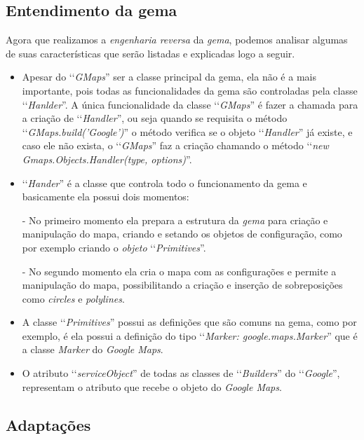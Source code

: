  
\subsection{Entendimento da gema} 
\label{subsection:entendimento_da_gema} 

Agora que realizamos a \emph{engenharia reversa} da \emph{gema}, podemos analisar algumas de suas 
características que serão listadas e explicadas logo a seguir.

\begin{itemize}

 \item Apesar do ‘‘\emph{GMaps}'' ser a classe principal da gema, ela não é a mais
 importante, pois todas as funcionalidades da gema são controladas pela classe
 ‘‘\emph{Hanlder}''. A única funcionalidade da classe ‘‘\emph{GMaps}'' é fazer a chamada
 para a criação de ‘‘\emph{Handler}'', ou seja quando se requisita o método 
 ‘‘\emph{GMaps.build('Google')}'' o método verifica se o objeto ‘‘\emph{Handler}'' já
 existe, e caso ele não exista, o ‘‘\emph{GMaps}'' faz a criação chamando o método 
 ‘‘\emph{new Gmaps.Objects.Handler(type, options)}''.

 \item ‘‘\emph{Hander}'' é a classe que controla todo o funcionamento da gema e 
 basicamente ela possui dois momentos:
 
  \subitem - No primeiro momento ela prepara a estrutura da \emph{gema} para criação e manipulação
  do mapa, criando e setando os objetos de configuração, como por exemplo criando o \emph{objeto}
  ‘‘\emph{Primitives}''.
  
  \subitem - No segundo momento ela cria o mapa com as configurações e permite a manipulação do mapa, 
  possibilitando a criação e inserção de sobreposições como \emph{circles} e \emph{polylines}.
 
 \item A classe ‘‘\emph{Primitives}'' possui as definições que são comuns na gema, 
 como por exemplo, é ela possui a definição do tipo ‘‘\emph{Marker: google.maps.Marker}'' que 
 é a classe \emph{Marker} do \emph{Google Maps}.
 
 \item O atributo ‘‘\emph{serviceObject}'' de todas as classes de 
 ‘‘\emph{Builders}'' do ‘‘\emph{Google}'', representam o atributo que recebe o objeto do 
 \emph{Google Maps}.
 
\end{itemize}
 
\subsection{Adaptações}
\label{subsection:adaptações}

